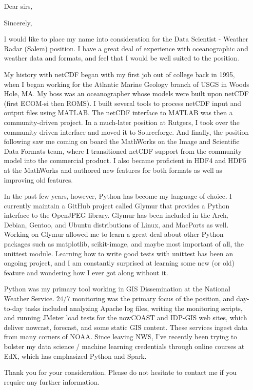 \documentclass[11pt]{moderncv}  %
\begin{document}
\makecvtitle

\opening{Dear sirs,}
\closing{Sincerely,}


\makelettertitle

I would like to place my name into consideration for the Data Scientist - Weather Radar (Salem) position.   I have a great deal of experience with oceanographic and weather data and formats, and feel that I would be well suited to the position.

My history with netCDF began with my first job out of college back in 1995, 
when I began working for the Atlantic Marine Geology branch of USGS in Woods Hole,
MA.  My boss was an oceanographer whose models were built upon netCDF (first ECOM-si then ROMS).  I built several tools to process netCDF input and output files using
MATLAB.  The netCDF interface to MATLAB was then a community-driven project.
In a much-later position at Rutgers, I took over the community-driven interface
and moved it to Sourceforge.  And finally, the position following saw me
coming on board the MathWorks on the Image and Scientific Data Formats team, where I transitioned netCDF support from the community model into the commercial product.  I also became proficient in HDF4 and HDF5 at the MathWorks and authored new features for both formats as well as improving old features.

In the past few years, however, Python has become my language of choice.  I currently
maintain a GitHub project called Glymur that provides a Python interface
to the OpenJPEG library.  Glymur has been included in the Arch, Debian,
Gentoo, and Ubuntu distributions of Linux, and MacPorts as well.
Working on Glymur allowed me to learn a great deal about other Python
packages such as matplotlib, scikit-image, and maybe most important of
all, the unittest module.  Learning how to write good tests with unittest
has been an ongoing project, and I am constantly surprised at learning
some new (or old) feature and wondering how I ever got along without it.

Python was my primary tool working in GIS Dissemination at the National
Weather Service.  24/7 monitoring was the primary focus of the position,
and day-to-day tasks included analyzing Apache log files, writing the
monitoring scripts, and running JMeter load tests for the nowCOAST and
IDP-GIS web sites, which deliver nowcast, forecast, and some static
GIS content.  These services ingest data from many corners of NOAA.  Since leaving NWS, I've recently been trying to bolster my data science / machine learning credentials through online courses at EdX, which has emphasized Python and Spark.

Thank you for your consideration.  Please do not hesitate to contact
me if you require any further information.

\makeletterclosing
\end{document}
